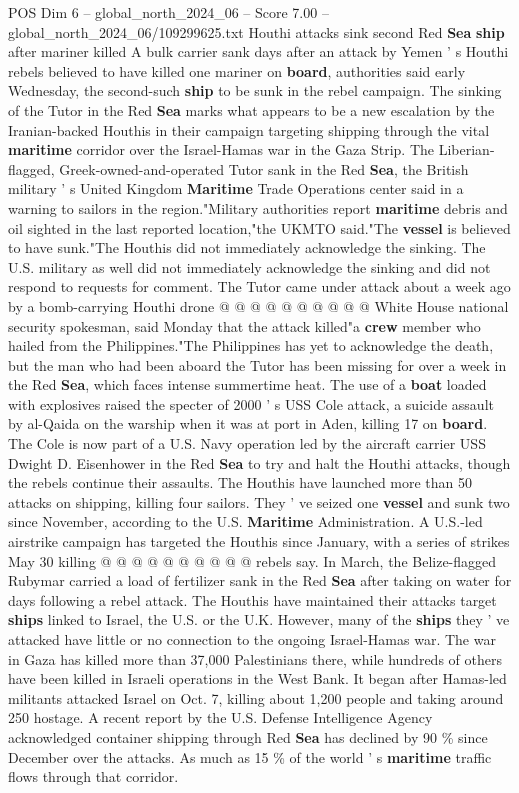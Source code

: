 \begin{textsample}{POS Dim 6 – global\_north\_2024\_06 – Score 7.00 – global\_north\_2024\_06/109299625.txt}  \label{ex:f6_pos_144}
Houthi attacks sink second Red \textbf{Sea} \textbf{ship} after mariner killed A bulk carrier sank days after an attack by Yemen ' s Houthi rebels believed to have killed one mariner on \textbf{board}, authorities said early Wednesday, the second-such \textbf{ship} to be sunk in the rebel campaign.
The sinking of the Tutor in the Red \textbf{Sea} marks what appears to be a new escalation by the Iranian-backed Houthis in their campaign targeting shipping through the vital \textbf{maritime} corridor over the Israel-Hamas war in the Gaza Strip.
The Liberian-flagged, Greek-owned-and-operated Tutor sank in the Red \textbf{Sea}, the British military ' s United Kingdom \textbf{Maritime} Trade Operations center said in a warning to sailors in the region."Military authorities report \textbf{maritime} debris and oil sighted in the last reported location,"the UKMTO said."The \textbf{vessel} is believed to have sunk."The Houthis did not immediately acknowledge the sinking.
The U.S. military as well did not immediately acknowledge the sinking and did not respond to requests for comment.
The Tutor came under attack about a week ago by a bomb-carrying Houthi drone @ @ @ @ @ @ @ @ @ @ White House national security spokesman, said Monday that the attack killed"a \textbf{crew} member who hailed from the Philippines."The Philippines has yet to acknowledge the death, but the man who had been aboard the Tutor has been missing for over a week in the Red \textbf{Sea}, which faces intense summertime heat.
The use of a \textbf{boat} loaded with explosives raised the specter of 2000 ' s USS Cole attack, a suicide assault by al-Qaida on the warship when it was at port in Aden, killing 17 on \textbf{board}.
The Cole is now part of a U.S.
Navy operation led by the aircraft carrier USS Dwight D.
Eisenhower in the Red \textbf{Sea} to try and halt the Houthi attacks, though the rebels continue their assaults.
The Houthis have launched more than 50 attacks on shipping, killing four sailors.
They ' ve seized one \textbf{vessel} and sunk two since November, according to the U.S. \textbf{Maritime} Administration.
A U.S.-led airstrike campaign has targeted the Houthis since January, with a series of strikes May 30 killing @ @ @ @ @ @ @ @ @ @ rebels say.
In March, the Belize-flagged Rubymar carried a load of fertilizer sank in the Red \textbf{Sea} after taking on water for days following a rebel attack.
The Houthis have maintained their attacks target \textbf{ships} linked to Israel, the U.S. or the U.K.
However, many of the \textbf{ships} they ' ve attacked have little or no connection to the ongoing Israel-Hamas war.
The war in Gaza has killed more than 37,000 Palestinians there, while hundreds of others have been killed in Israeli operations in the West Bank.
It began after Hamas-led militants attacked Israel on Oct. 7, killing about 1,200 people and taking around 250 hostage.
A recent report by the U.S.
Defense Intelligence Agency acknowledged container shipping through Red \textbf{Sea} has declined by 90 \% since December over the attacks.
As much as 15 \% of the world ' s \textbf{maritime} traffic flows through that corridor.

\end{textsample}
